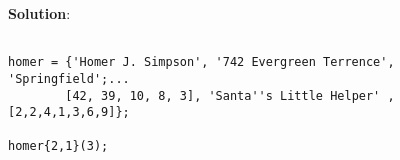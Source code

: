 \begin{outline}[enumerate]
\if {}
\textbf{Solution}: 
{\color{blue}
\begin{lstlisting}

homer = {'Homer J. Simpson', '742 Evergreen Terrence', 'Springfield';...
        [42, 39, 10, 8, 3], 'Santa''s Little Helper' ,[2,2,4,1,3,6,9]};
        
homer{2,1}(3);
\end{lstlisting}
}
\fi

\vfill 



\end{outline}
